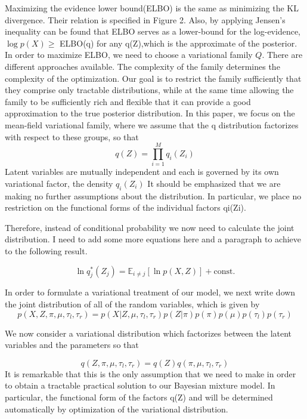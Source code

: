\documentclass[runningheads]{llncs}
\begin{document}
Maximizing the evidence lower bound(ELBO) is the same as minimizing the KL divergence. Their relation is specified in Figure 2.
Also, by applying Jensen's inequality can be found that ELBO serves as a lower-bound for the log-evidence, $\log p(X) \geq$ ELBO(q) for any q(Z),which is
the approximate of the posterior.  
In order to maximize ELBO, we need to choose a variational family $Q$. There are different approaches available.
The complexity of the family determines the complexity of the optimization. Our goal is to restrict the family sufficiently that they comprise only tractable distributions,
while at the same time allowing the family to be sufficiently rich and flexible that it
can provide a good approximation to the true posterior distribution.
In this paper, we focus on the mean-field variational family, where we assume that the q distribution factorizes
with respect to these groups, so that
\begin{equation}
   q(Z) = \prod_{i=1}^{M}q_i(Z_i)
\end{equation}
Latent variables are mutually independent and each is governed by its own variational 
factor, the density $q_i(Z_i)$
It should be emphasized that we are making no further assumptions about the distribution.
In particular, we place no restriction on the functional forms of the individual
factors qi(Zi).

Therefore, instead of conditional probability we now need to calculate the joint distribution. 
I need to add some more equations here and a paragraph to achieve to the following result. 

\begin{equation}
   \ln q^*_j (Z_j) = \mathbb{E}_{i \neq j}[\ln p(X,Z)] + \text{const.}
\end{equation}

In order to formulate a variational treatment of our model, we next write down
the joint distribution of all of the random variables, which is given by
\begin{equation}
p(X,Z,\pi,\mu,\tau_{l},\tau_{r}) = p(X|Z,\mu,\tau_{l},\tau_{r})p(Z|\pi)p(\pi)p(\mu)p(\tau_{l})p(\tau_{r})
\end{equation}

We now consider a variational distribution which factorizes between the latent
variables and the parameters so that

\begin{equation}
   q(Z,\pi,\mu,\tau_{l},\tau_{r}) = q(Z)q(\pi,\mu,\tau_l,\tau_r)
\end{equation}
It is remarkable that this is the only assumption that we need to make in order to
obtain a tractable practical solution to our Bayesian mixture model. In particular, the
functional form of the factors q(Z) and will be determined automatically
by optimization of the variational distribution.
\end{document}
